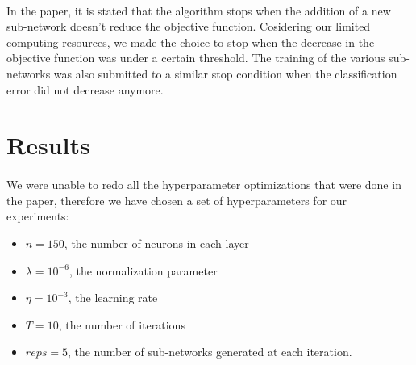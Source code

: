 \documentclass[11 pt]{article}
\begin{document}
\paragraph{}In the paper, it is stated that the algorithm stops when the addition of a new sub-network doesn't reduce the objective function. Cosidering our limited computing resources, we made the choice to stop when the decrease in the objective function was under a certain threshold. The training of the various sub-networks was also submitted to a similar stop condition when the classification error did not decrease anymore.

\section{Results}
\paragraph{} We were unable to redo all the hyperparameter optimizations that were done in the paper, therefore we have chosen a set of hyperparameters for our experiments:

\begin{itemize}
  \item \(n=150\), the number of neurons in each layer
  \item \(\lambda = 10^{-6}\), the normalization parameter
  \item \(\eta=10^{-3}\), the learning rate
  \item \(T=10\), the number of iterations
  \item \(reps=5\), the number of sub-networks generated at each iteration.
\end{itemize}
\end{document}
